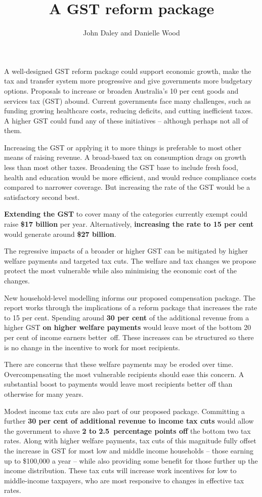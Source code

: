 \documentclass{grattanAlpha}
\title{A GST reform package}
\author{John Daley and Danielle Wood}
\begin{document}
\newlength{\overviewextra}
\setlength{\overviewextra}{2pt}
\addtolength{\columnsep}{\overviewextra}
\begin{overview}[-20pt]
A well-designed GST reform package could support economic growth, make the tax and transfer system more progressive and give governments more budgetary options.
Proposals to increase or broaden Australia’s 10 per cent goods and services tax (GST) abound. Current governments face many challenges, such as funding growing healthcare costs, reducing deficits, and cutting inefficient taxes. A higher GST could fund any of these initiatives – although perhaps not all of them. 

Increasing the GST or applying it to more things is preferable to most other means of raising revenue. A broad-based tax on consumption drags on growth less than most other taxes. Broadening the GST base to include fresh food, health and education would be more efficient, and would reduce compliance costs compared to narrower coverage. But increasing the rate of the GST would be a satisfactory second best.  

\textbf{Extending the GST} to cover many of the categories currently exempt could raise \textbf{\$17 billion} per year. Alternatively, \textbf{increasing the rate to 15 per cent} would generate around \textbf{\$27 billion}. 

The regressive impacts of a broader or higher GST can be mitigated by higher welfare payments and targeted tax cuts. The welfare and tax changes we propose protect the most vulnerable while also minimising the economic cost of the changes. 

New household-level modelling informs our proposed compensation package. The report works through the implications of a reform package that increases the rate to 15 per cent. Spending around \textbf{30 per cent} of the additional revenue from a higher GST \textbf{on higher welfare payments} would leave most of the bottom 20 per cent of income earners better~off. These increases can be structured so there is no change in the incentive to work for most recipients. 

There are concerns that these welfare payments may be eroded over time. Overcompensating the most vulnerable recipients should ease this concern. A substantial boost to payments would leave most recipients better off than otherwise for many years.

Modest income tax cuts are also part of our proposed package. Committing a further \textbf{30 per cent of additional revenue to income tax cuts} would allow the government to shave \textbf{2 to 2.5~percentage points off} the bottom two tax rates. Along with higher welfare payments, tax cuts of this magnitude fully offset the increase in GST for most low and middle income households – those earning up to \$100,000 a year – while also providing some benefit for those further up the income distribution. These tax cuts will increase work incentives for low to middle-income taxpayers, who are most responsive to changes in effective tax rates. 


\end{overview}
\end{document}
